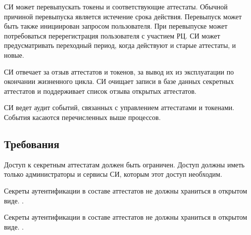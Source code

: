 %

СИ может перевыпускать токены и соответствующие аттестаты. Обычной причиной
перевыпуска является истечение срока действия. Перевыпуск может быть также
инициирован запросом пользователя. При перевыпуске может потребоваться
перерегистрация пользователя с участием РЦ. СИ может предусматривать переходный
период, когда действуют и старые аттестаты, и новые.

СИ отвечает за отзыв аттестатов и токенов, за вывод их из эксплуатации по 
окончании жизненного цикла. 
%
СИ очищает записи в базе данных секретных аттестатов и поддерживает список 
отзыва открытых аттестатов.

СИ ведет аудит событий, связанных с управлением аттестатами и токенами. 
События касаются перечисленных выше процессов.

\subsection{Требования}\label{CM.Reqs}

Доступ к секретным аттестатам должен быть ограничен.
Доступ должны иметь только администраторы и сервисы СИ,
которым этот доступ необходим. 

Секреты аутентификации в составе аттестатов не должны храниться в открытом 
виде. 
%
.
%

Секреты аутентификации в составе аттестатов не должны храниться в открытом 
виде. .


